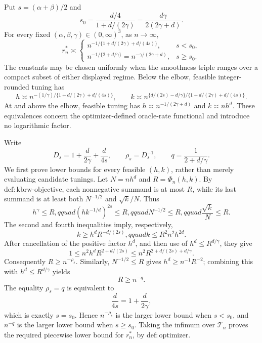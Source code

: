 Put \(s=(\alpha+\beta)/2\) and
\[
 s_0=\frac{d/4}{1+d/(2\gamma)}=\frac{d\gamma}{2(2\gamma+d)}.
\]
For every fixed \((\alpha,\beta,\gamma)\in(0,\infty)^3\), as \(n\to\infty\),
\[
 r_n^*\asymp
 \begin{cases}
 n^{-1/\{1+d/(2\gamma)+d/(4s)\}},&s<s_0,\\
 n^{-1/\{2+d/\gamma\}}=n^{-\gamma/(2\gamma+d)},&s\geq s_0.
 \end{cases}
\]
The constants may be chosen uniformly when the smoothness triple ranges over a compact subset of either displayed regime.  Below the elbow, feasible integer-rounded tuning has
\[
 h\asymp n^{-(1/\gamma)/\{1+d/(2\gamma)+d/(4s)\}},\qquad
 k\asymp n^{\{d/(2s)-d/\gamma\}/\{1+d/(2\gamma)+d/(4s)\}}.
\]
At and above the elbow, feasible tuning has \(h\asymp n^{-1/(2\gamma+d)}\) and \(k\asymp nh^d\).  These equivalences concern the optimizer-defined oracle-rate functional and introduce no logarithmic factor.

Write
\[
 D_s=1+\frac{d}{2\gamma}+\frac{d}{4s},\qquad
 \rho_s=D_s^{-1},\qquad q=\frac{1}{2+d/\gamma}.
\]
We first prove lower bounds for every feasible \((h,k)\), rather than merely evaluating candidate tunings.  Let \(N=nh^d\) and \(R=\Phi_n(h,k)\).  By \(\mathrm{def:kbrw\mbox{-}objective}\), each nonnegative summand is at most \(R\), while its last summand is at least both \(N^{-1/2}\) and \(\sqrt{k}/N\).  Thus
\[
 h^\gamma\leq R,qquad
 \left(hk^{-1/d}\right)^{2s}\leq R,qquad
 N^{-1/2}\leq R,qquad
 \frac{\sqrt{k}}{N}\leq R.
\]
The second and fourth inequalities imply, respectively,
\[
 k\geq h^dR^{-d/(2s)},qquad k\leq R^2n^2h^{2d}.
\]
After cancellation of the positive factor \(h^d\), and then use of \(h^d\leq R^{d/\gamma}\), they give
\[
 1\leq n^2h^dR^{2+d/(2s)}
 \leq n^2R^{2+d/(2s)+d/\gamma}.
\]
Consequently \(R\geq n^{-\rho_s}\).  Similarly, \(N^{-1/2}\leq R\) gives \(h^d\geq n^{-1}R^{-2}\); combining this with \(h^d\leq R^{d/\gamma}\) yields
\[
 R\geq n^{-q}.
\]
The equality \(\rho_s=q\) is equivalent to
\[
 \frac{d}{4s}=1+\frac{d}{2\gamma},
\]
which is exactly \(s=s_0\).  Hence \(n^{-\rho_s}\) is the larger lower bound when \(s<s_0\), and \(n^{-q}\) is the larger lower bound when \(s\geq s_0\).  Taking the infimum over \(\mathcal T_n\) proves the required piecewise lower bound for \(r_n^*\), by \(\mathrm{def:optimizer}\).

